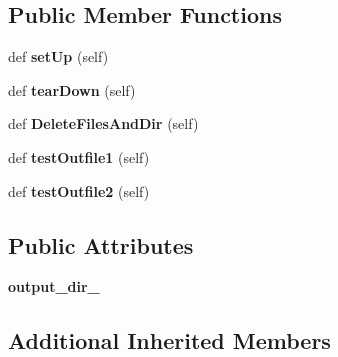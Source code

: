 \subsection*{Public Member Functions}
\begin{DoxyCompactItemize}
\item 
\mbox{\label{classgtest__xml__outfiles__test_1_1_g_test_x_m_l_out_files_test_a56550f293277d18c36e868a637fe1153}} 
def {\bfseries set\+Up} (self)
\item 
\mbox{\label{classgtest__xml__outfiles__test_1_1_g_test_x_m_l_out_files_test_a49d1d410370ba8a3cfcc281eaadb5706}} 
def {\bfseries tear\+Down} (self)
\item 
\mbox{\label{classgtest__xml__outfiles__test_1_1_g_test_x_m_l_out_files_test_a503d2fbc9cd782ae57ac4307d2db43e1}} 
def {\bfseries Delete\+Files\+And\+Dir} (self)
\item 
\mbox{\label{classgtest__xml__outfiles__test_1_1_g_test_x_m_l_out_files_test_a034738bbc00ac46d00f183402c561228}} 
def {\bfseries test\+Outfile1} (self)
\item 
\mbox{\label{classgtest__xml__outfiles__test_1_1_g_test_x_m_l_out_files_test_a3c02687f092a482d0d0260c7ed94c618}} 
def {\bfseries test\+Outfile2} (self)
\end{DoxyCompactItemize}
\subsection*{Public Attributes}
\begin{DoxyCompactItemize}
\item 
\mbox{\label{classgtest__xml__outfiles__test_1_1_g_test_x_m_l_out_files_test_aa5c31cd97047bc1d3060f4d27bc956a4}} 
{\bfseries output\+\_\+dir\+\_\+}
\end{DoxyCompactItemize}
\subsection*{Additional Inherited Members}



